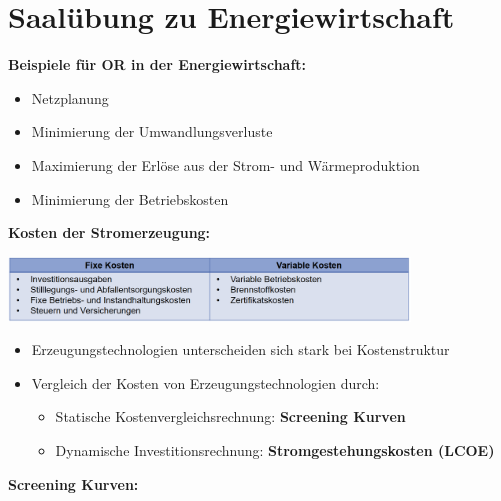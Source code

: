 \section{Saalübung zu Energiewirtschaft}

\textbf{Beispiele für OR in der Energiewirtschaft:}
\begin{itemize}
	\item Netzplanung
	\item Minimierung der Umwandlungsverluste
	\item Maximierung der Erlöse aus der Strom- und Wärmeproduktion
	\item Minimierung der Betriebskosten
\end{itemize}
\bigskip
\textbf{Kosten der Stromerzeugung:}
\begin{center}
	\includegraphics[width=0.8\textwidth]{images/costs.png}
\end{center}
\begin{itemize}
	\item Erzeugungstechnologien unterscheiden sich stark bei Kostenstruktur
	\item Vergleich der Kosten von Erzeugungstechnologien durch:
	\begin{itemize}
		\item Statische Kostenvergleichsrechnung: \textbf{Screening Kurven}
		\item Dynamische Investitionsrechnung: \textbf{Stromgestehungskosten (LCOE)}
	\end{itemize}
\end{itemize}
\bigskip
\textbf{Screening Kurven:}
